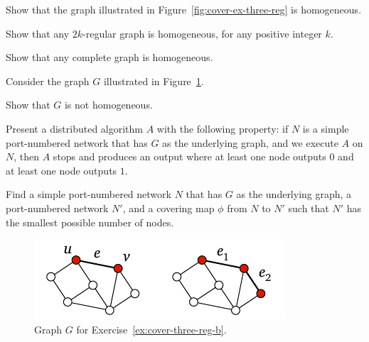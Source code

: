 \begin{ex}\label{ex:cover-three-reg2}
    Show that the graph illustrated in Figure~\ref{fig:cover-ex-three-reg} is homogeneous.

\end{ex}

\begin{ex}
    Show that any $2k$-regular graph is homogeneous, for any positive integer $k$.
\end{ex}

\begin{ex}\label{ex:cover-complete}
    Show that any complete graph is homogeneous.

\end{ex}

\begin{ex}\label{ex:cover-three-reg-b}
    Consider the graph $G$ illustrated in Figure~\ref{fig:cover-ex-three-reg-b}.
    \begin{subex}
        \item Show that $G$ is not homogeneous.
        \item Present a distributed algorithm $A$ with the following property: if $N$ is a simple port-numbered network that has $G$ as the underlying graph, and we execute $A$ on $N$, then $A$ stops and produces an output where at least one node outputs $0$ and at least one node outputs $1$.
        \item Find a simple port-numbered network $N$ that has $G$ as the underlying graph, a port-numbered network $N'$, and a covering map $\phi$ from $N$ to $N'$ such that $N'$ has the smallest possible number of nodes.
    \end{subex}

    \begin{figure}
        \centering
        \includegraphics[page=\PCoverExThreeRegB]{figs.pdf}
        \caption{Graph $G$ for Exercise~\ref{ex:cover-three-reg-b}.}\label{fig:cover-ex-three-reg-b}
    \end{figure}
\end{ex}

